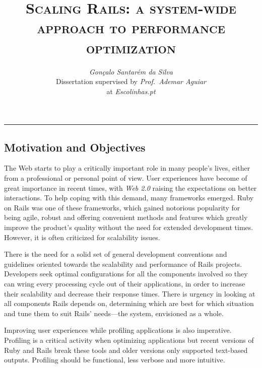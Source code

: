 \documentclass[9pt,a4paper]{extarticle}
\begin{document}
\title{\vspace*{-8mm}\textbf{\textsc{Scaling Rails: a system-wide approach to performance optimization}}}
\author{\emph{Gonçalo Santarém da Silva}\\[2mm]
\small{Dissertation supervised by \emph{Prof.\ Ademar Aguiar}}\\
\small{at \emph{Escolinhas.pt}}}
\date{}
\maketitle
\thispagestyle{empty}

\vspace*{-4mm}\noindent\rule{\textwidth}{0.4pt}\vspace*{4mm}

\begin{multicols}{2}


\section{Motivation and Objectives}
The Web starts to play a critically important role in many people's lives, either from a professional or personal point of view. User experiences have become of great importance in recent times, with \textit{Web 2.0} raising the expectations on better interactions. To help coping with this demand, many frameworks emerged. Ruby on Rails was one of these frameworks, which gained notorious popularity for being agile, robust and offering convenient methods and features which greatly improve the product's quality without the need for extended development times. However, it is often criticized for scalability issues.

There is the need for a solid set of general development conventions and guidelines oriented towards the scalability and performance of Rails projects. Developers seek optimal configurations for all the components involved so they can wring every processing cycle out of their applications, in order to increase their scalability and decrease their response times. There is urgency in looking at all components Rails depends on, determining which are best for which situation and tune them to suit Rails' needs---the system, envisioned as a whole.

Improving user experiences while profiling applications is also imperative. Profiling is a critical activity when optimizing applications but recent versions of Ruby and Rails break these tools and older versions only supported text-based outputs. Profiling should be functional, less verbose and more intuitive.


\end{multicols}
\end{document}
